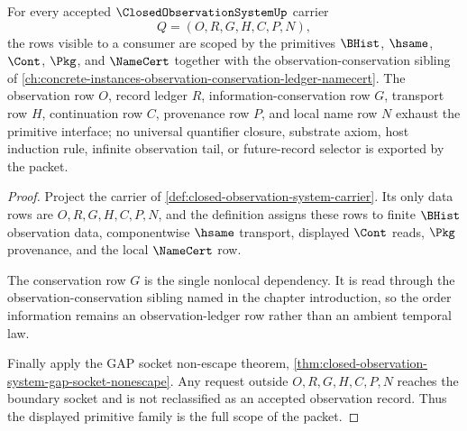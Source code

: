 \begin{theorem}
\label{thm:closed-observation-system-primitive-scope}
For every accepted $\ClosedObservationSystemUp$ carrier
$$
Q=(O,R,G,H,C,P,N),
$$
the rows visible to a consumer are scoped by the primitives $\BHist$, $\hsame$, $\Cont$, $\Pkg$, and $\NameCert$ together with the observation-conservation sibling of \autoref{ch:concrete-instances-observation-conservation-ledger-namecert}. The observation row $O$, record ledger $R$, information-conservation row $G$, transport row $H$, continuation row $C$, provenance row $P$, and local name row $N$ exhaust the primitive interface; no universal quantifier closure, substrate axiom, host induction rule, infinite observation tail, or future-record selector is exported by the packet.
\end{theorem}
\begin{proof}
Project the carrier of \autoref{def:closed-observation-system-carrier}. Its only data rows are $O,R,G,H,C,P,N$, and the definition assigns these rows to finite $\BHist$ observation data, componentwise $\hsame$ transport, displayed $\Cont$ reads, $\Pkg$ provenance, and the local $\NameCert$ row.

The conservation row $G$ is the single nonlocal dependency. It is read through the observation-conservation sibling named in the chapter introduction, so the order information remains an observation-ledger row rather than an ambient temporal law.

Finally apply the GAP socket non-escape theorem, \autoref{thm:closed-observation-system-gap-socket-nonescape}. Any request outside $O,R,G,H,C,P,N$ reaches the boundary socket and is not reclassified as an accepted observation record. Thus the displayed primitive family is the full scope of the packet.
\end{proof}

